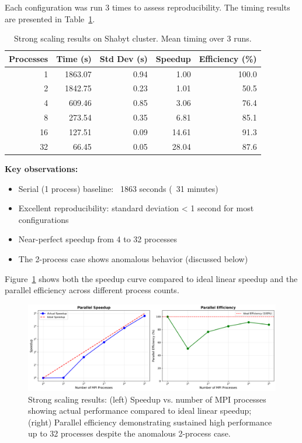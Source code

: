\documentclass[11pt,a4paper]{article}
\begin{document}
	Each configuration was run 3 times to assess reproducibility. The timing results are presented in Table~\ref{table:timings}.
	
	\begin{table}[H]
		\centering
		\caption{Strong scaling results on Shabyt cluster. Mean timing over 3 runs.}
		\label{table:timings}
		\begin{tabular}{rrrrr}
			\toprule
			Processes & Time (s) & Std Dev (s) & Speedup & Efficiency (\%) \\
			\midrule
			1  & 1863.07 & 0.94  & 1.00  & 100.0 \\
			2  & 1842.75 & 0.23  & 1.01  & 50.5 \\
			4  & 609.46  & 0.85  & 3.06  & 76.4 \\
			8  & 273.54  & 0.35  & 6.81  & 85.1 \\
			16 & 127.51  & 0.09  & 14.61 & 91.3 \\
			32 & 66.45   & 0.05  & 28.04 & 87.6 \\
			\bottomrule
		\end{tabular}
	\end{table}
	
	\textbf{Key observations:}
	\begin{itemize}
		\item Serial (1 process) baseline: ~1863 seconds (~31 minutes)
		\item Excellent reproducibility: standard deviation < 1 second for most configurations
		\item Near-perfect speedup from 4 to 32 processes
		\item The 2-process case shows anomalous behavior (discussed below)
	\end{itemize}
	
	Figure~\ref{fig:scaling} shows both the speedup curve compared to ideal linear speedup and the parallel efficiency across different process counts.
	
	\begin{figure}[H]
		\centering
		\includegraphics[width=\linewidth]{../scaling_plots.png}
		\caption{Strong scaling results: (left) Speedup vs. number of MPI processes showing actual performance compared to ideal linear speedup; (right) Parallel efficiency demonstrating sustained high performance up to 32 processes despite the anomalous 2-process case.}
		\label{fig:scaling}
	\end{figure}
	
\end{document}

